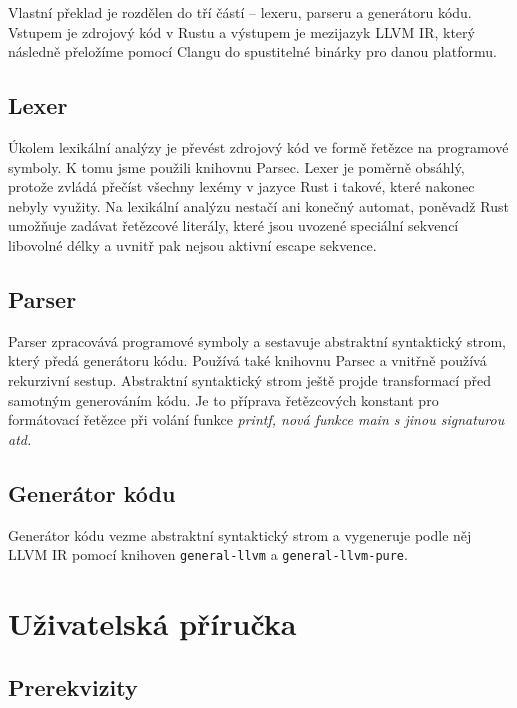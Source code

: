 \documentclass[12pt,a4paper]{article}
\begin{document}
Vlastní překlad je rozdělen do tří částí -- lexeru, parseru a generátoru kódu. Vstupem je zdrojový kód v Rustu a výstupem je mezijazyk LLVM IR, který následně přeložíme pomocí Clangu do spustitelné binárky pro danou platformu.

\subsection{Lexer}

Úkolem lexikální analýzy je převést zdrojový kód ve formě řetězce na programové symboly. K tomu jsme použili knihovnu Parsec. Lexer je poměrně obsáhlý, protože zvládá přečíst všechny lexémy v jazyce Rust i takové, které nakonec nebyly využity. Na lexikální analýzu nestačí ani konečný automat, poněvadž Rust umožňuje zadávat řetězcové literály, které jsou uvozené speciální sekvencí libovolné délky a uvnitř pak nejsou aktivní escape sekvence.

\subsection{Parser}

Parser zpracovává programové symboly a sestavuje abstraktní syntaktický strom, který předá generátoru kódu. Používá také knihovnu Parsec a vnitřně používá rekurzivní sestup. Abstraktní syntaktický strom ještě projde transformací před samotným generováním kódu. Je to příprava řetězcových konstant pro formátovací řetězce při volání funkce \em{printf}, nová funkce \em{main} s jinou signaturou atd.

\subsection{Generátor kódu}

Generátor kódu vezme abstraktní syntaktický strom a vygeneruje podle něj LLVM IR pomocí knihoven \texttt{general-llvm} a \texttt{general-llvm-pure}.


\section{Uživatelská příručka}

\subsection{Prerekvizity}
\end{document}
